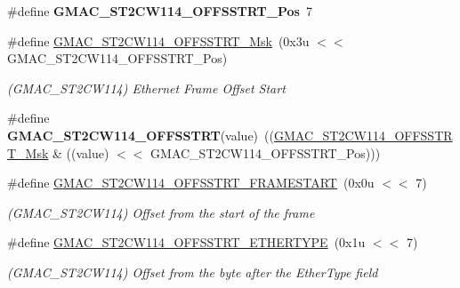 \begin{DoxyCompactItemize}
\item 
\mbox{\label{group__SAMV71__GMAC_gad5eabe8a76317266e2fca53037591c58}} 
\#define {\bfseries G\+M\+A\+C\+\_\+\+S\+T2\+C\+W114\+\_\+\+O\+F\+F\+S\+S\+T\+R\+T\+\_\+\+Pos}~7
\item 
\mbox{\label{group__SAMV71__GMAC_ga0003ad736105a544d6e773316c397157}} 
\#define \mbox{\hyperlink{group__SAMV71__GMAC_ga0003ad736105a544d6e773316c397157}{G\+M\+A\+C\+\_\+\+S\+T2\+C\+W114\+\_\+\+O\+F\+F\+S\+S\+T\+R\+T\+\_\+\+Msk}}~(0x3u $<$$<$ G\+M\+A\+C\+\_\+\+S\+T2\+C\+W114\+\_\+\+O\+F\+F\+S\+S\+T\+R\+T\+\_\+\+Pos)
\begin{DoxyCompactList}\small\item\em (G\+M\+A\+C\+\_\+\+S\+T2\+C\+W114) Ethernet Frame Offset Start \end{DoxyCompactList}\item 
\mbox{\label{group__SAMV71__GMAC_ga8d2bc9f65930306376b1ce22204a81e3}} 
\#define {\bfseries G\+M\+A\+C\+\_\+\+S\+T2\+C\+W114\+\_\+\+O\+F\+F\+S\+S\+T\+RT}(value)~((\mbox{\hyperlink{group__SAMV71__GMAC_ga0003ad736105a544d6e773316c397157}{G\+M\+A\+C\+\_\+\+S\+T2\+C\+W114\+\_\+\+O\+F\+F\+S\+S\+T\+R\+T\+\_\+\+Msk}} \& ((value) $<$$<$ G\+M\+A\+C\+\_\+\+S\+T2\+C\+W114\+\_\+\+O\+F\+F\+S\+S\+T\+R\+T\+\_\+\+Pos)))
\item 
\mbox{\label{group__SAMV71__GMAC_ga35e12eda749231508088c9485ef48ddf}} 
\#define \mbox{\hyperlink{group__SAMV71__GMAC_ga35e12eda749231508088c9485ef48ddf}{G\+M\+A\+C\+\_\+\+S\+T2\+C\+W114\+\_\+\+O\+F\+F\+S\+S\+T\+R\+T\+\_\+\+F\+R\+A\+M\+E\+S\+T\+A\+RT}}~(0x0u $<$$<$ 7)
\begin{DoxyCompactList}\small\item\em (G\+M\+A\+C\+\_\+\+S\+T2\+C\+W114) Offset from the start of the frame \end{DoxyCompactList}\item 
\mbox{\label{group__SAMV71__GMAC_gaef25eb112e5bb00d304f3f0ae7b18279}} 
\#define \mbox{\hyperlink{group__SAMV71__GMAC_gaef25eb112e5bb00d304f3f0ae7b18279}{G\+M\+A\+C\+\_\+\+S\+T2\+C\+W114\+\_\+\+O\+F\+F\+S\+S\+T\+R\+T\+\_\+\+E\+T\+H\+E\+R\+T\+Y\+PE}}~(0x1u $<$$<$ 7)
\begin{DoxyCompactList}\small\item\em (G\+M\+A\+C\+\_\+\+S\+T2\+C\+W114) Offset from the byte after the Ether\+Type field \end{DoxyCompactList}\item 

\end{DoxyCompactItemize}
